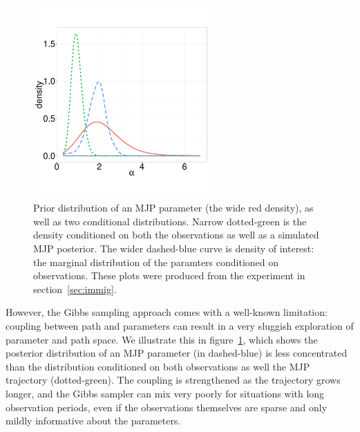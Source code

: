   \begin{figure}%
  \centering
  \begin{minipage}[hp]{0.44\linewidth}
  \centering
    \vspace{-0 in}
    \includegraphics [width=0.6\textwidth, angle=0]{figs/dist_beta.pdf}
    \vspace{0.2 in}
  \end{minipage}
  \begin{minipage}[hp]{0.55\linewidth}
    \vspace{-0.3 in}
  \caption{Prior distribution of an MJP parameter (the wide red density),
  as well as two conditional distributions. Narrow dotted-green is the
density conditioned on both the observations as well as a simulated
MJP posterior. The wider dashed-blue curve is density of interest: the
marginal distribution of the paramters conditioned on observations. These
plots were produced from the experiment in section~\ref{sec:immig}.}
     \label{fig:hist}
  \end{minipage}
    \vspace{-0.6 in}
  \end{figure}
  However, the Gibbs sampling approach %
  comes with a well-known limitation:
coupling between path and parameters can result in a very sluggish
exploration of parameter and path space. We illustrate this in figure~\ref{fig:hist},
which shows the posterior distribution of an MJP parameter (in dashed-blue)
is less concentrated than the distribution conditioned on both observations 
as well the MJP trajectory (dotted-green). 
The coupling is strengthened as the trajectory grows longer, and
the Gibbs sampler can mix very poorly for situations with
long observation periods, even if the observations themselves are
sparse and only mildly informative about the parameters.

